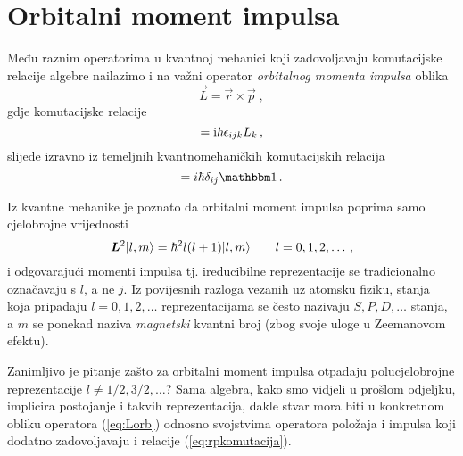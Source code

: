 \section{Orbitalni moment impulsa}

Među raznim operatorima u kvantnoj mehanici koji zadovoljavaju
komutacijske relacije  algebre nailazimo i na važni
operator \emph{orbitalnog momenta impulsa} oblika 
\begin{equation}
\vec{L} = \vec{r} \times \vec{p} \;,
\label{eq:Lorb}
\end{equation}
gdje  komutacijske relacije 
\begin{equation}
    [L_i, L_j] = \rmi \hbar \epsilon_{ijk} L_k \,,
\end{equation}
slijede izravno iz
temeljnih kvantnomehaničkih komutacijskih relacija
\begin{equation}
    [r_i, p_j] = i\hbar \delta_{ij} \Eins \,.
    \label{eq:rpkomutacija}
\end{equation}

Iz kvantne mehanike je poznato da orbitalni moment impulsa
poprima samo cjelobrojne vrijednosti 
\begin{equation}
     \vec{L}^2 \ket{l, m} = \hbar^2 l(l+1) \ket{l,m} \qquad l=0,1,2,\ldots\,,
\end{equation}
i odgovarajući momenti impulsa tj. ireducibilne
reprezentacije se tradicionalno označavaju s $l$, a ne $j$.
Iz povijesnih razloga vezanih uz atomsku fiziku, stanja koja
pripadaju $l=0,1,2,\ldots$ reprezentacijama
se često nazivaju $S, P, D,\ldots$ stanja, a $m$ se ponekad naziva
\emph{magnetski} kvantni broj (zbog svoje uloge u Zeemanovom efektu).

Zanimljivo je pitanje zašto za orbitalni moment impulsa otpadaju
polucjelobrojne reprezentacije $l \neq 1/2, 3/2, \ldots$?
    Sama algebra, kako smo vidjeli u prošlom odjeljku, implicira
postojanje i takvih reprezentacija, dakle stvar mora biti u konkretnom
obliku operatora (\ref{eq:Lorb}) odnosno svojstvima operatora
položaja i impulsa koji dodatno zadovoljavaju i relacije
(\ref{eq:rpkomutacija}).

